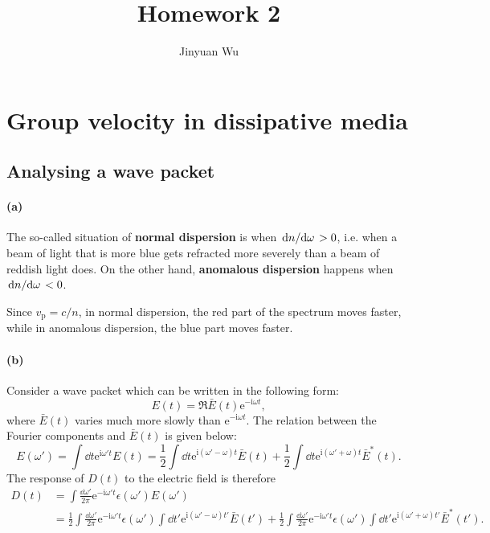 \documentclass[hyperref, a4paper]{article}
\title{Homework 2}
\author{Jinyuan Wu}
\newcommand*{\ii}{\mathrm{i}}
\newcommand*{\ee}{\mathrm{e}}
\newcommand*{\concept}[1]{{\textbf{#1}}}
\begin{document}
\maketitle

\section{Group velocity in dissipative media}

\subsection{Analysing a wave packet}

\paragraph{(a)} The so-called situation of \concept{normal dispersion} 
is when $\dv*{n}{\omega} > 0$, 
i.e. when a beam of light that is more blue gets refracted more severely 
than a beam of reddish light does.
On the other hand, \concept{anomalous dispersion} happens when $\dv*{n}{\omega} < 0$.

Since $v_{\text{p}} = c / n$,
in normal dispersion, the red part of the spectrum moves faster, 
while in anomalous dispersion, the blue part moves faster.

\paragraph{(b)} Consider a wave packet which can be written in the following form:
\begin{equation}
    E(t) = \Re \bar{E}(t) \ee^{- \ii \omega t},
\end{equation}
where $\bar{E}(t)$ varies much more slowly than $\ee^{- \ii \omega t}$.
The relation between the Fourier components and $\bar{E}(t)$ is given below:
\begin{equation}
    E(\omega') = \int \dd{t} \ee^{\ii \omega' t} E(t)
    = \frac{1}{2} \int \dd{t} \ee^{\ii (\omega' - \omega) t} \bar{E}(t)
    + \frac{1}{2} \int \dd{t} \ee^{\ii (\omega' + \omega) t} \bar{E}^*(t).
\end{equation}
The response of $D(t)$ to the electric field is therefore 
\begin{equation}
    \begin{aligned}
        D(t) &= \int \frac{\dd{\omega'}}{2\pi} \ee^{- \ii \omega' t} \epsilon(\omega') E(\omega') \\
        &= \frac{1}{2} \int \frac{\dd{\omega'}}{2\pi} \ee^{- \ii \omega' t} \epsilon(\omega') 
        \int \dd{t'} \ee^{\ii (\omega' - \omega) t'} \bar{E}(t') + 
        \frac{1}{2} \int \frac{\dd{\omega'}}{2\pi} \ee^{- \ii \omega' t} \epsilon(\omega') 
        \int \dd{t'} \ee^{\ii (\omega' + \omega) t'} \bar{E}^*(t').
    \end{aligned}
    \label{eq:e-to-d-1}
\end{equation}
\end{document}
